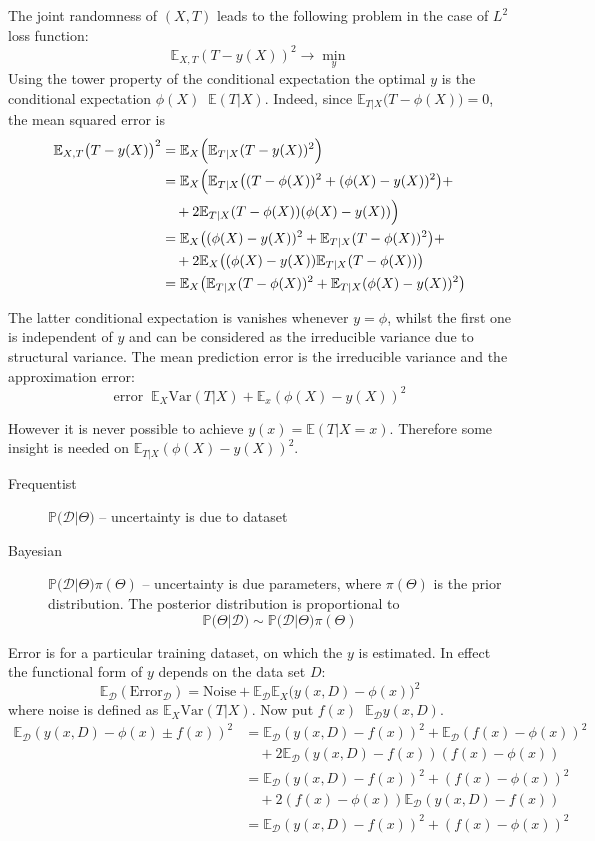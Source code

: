 \documentclass[a4paper]{article}
\newcommand{\brac}[1]{{\left ( #1 \right )}}
\newcommand{\Dcal}{\mathcal{D}}
\newcommand{\Ex}[0]{{\mathbb{E}}}
\newcommand{\pr}[0]{{\mathbb{P}}}
\newcommand{\Var}[0]{{\text{Var}}}
\newcommand{\defn}{\mathop{\overset{\Delta}{=}}\nolimits}
\begin{document}
The joint randomness of $(X,T)$ leads to the following problem in the case of $L^2$ loss function:
\[\Ex_{X,T} \brac{T-y(X)}^2 \to \min_y\]
Using the tower property of the conditional expectation the optimal $y$ is the conditional
expectation $\phi(X)\defn \Ex(T\rvert X)$. Indeed, since $\Ex_{T\rvert X} \bigl(T-\phi(X) \bigr) = 0$,
the mean squared error is \begin{align*}
	\Ex_{X,T} \bigl(T-y(X)\bigr)^2 &= \Ex_{X} \Bigl( \Ex_{T\rvert X} (T-y(X))^2 \Bigr) \\
		&= \Ex_X \Bigl( \Ex_{T\rvert X} \bigl( (T-\phi(X))^2+(\phi(X)-y(X))^2 \bigr) + \\
			&\quad + 2 \Ex_{T\rvert X} (T-\phi(X))(\phi(X)-y(X)) \Bigr) \\
		&= \Ex_X \bigl( (\phi(X)-y(X))^2 + \Ex_{T\rvert X} (T-\phi(X))^2 \bigr) + \\
			&\quad + 2 \Ex_X \bigl((\phi(X)-y(X)) \Ex_{T\rvert X} (T-\phi(X)) \bigr) \\
		&= \Ex_X \bigl( \Ex_{T\rvert X} (T-\phi(X))^2 + \Ex_{T\rvert X} (\phi(X)-y(X))^2 \bigr)
\end{align*}

The latter conditional expectation is vanishes whenever $y=\phi$, whilst the first one is
independent of $y$ and can be considered as the irreducible variance due to structural variance.
The mean prediction error is the irreducible variance and the approximation error:
\[\text{error} \defn \Ex_X \Var(T\rvert X) + \Ex_x (\phi(X)-y(X))^2 \]

However it is never possible to achieve $y(x) = \Ex(T\rvert X=x)$.
Therefore some insight is needed on $\Ex_{T\rvert X} (\phi(X)-y(X))^2$.
\begin{description}
	\item[Frequentist] $\pr\bigl(\Dcal\rvert \Theta\bigr)$ -- uncertainty is due to dataset
	\item[Bayesian] $\pr\bigl(\Dcal\rvert \Theta\bigr) \pi(\Theta)$ -- uncertainty is due
	parameters, where $\pi(\Theta)$ is the prior distribution.
	The posterior distribution is proportional to
		\[\pr\bigl(\Theta\rvert \Dcal\bigr) \sim \pr\bigl(\Dcal\rvert \Theta\bigr) \pi(\Theta)\]
\end{description}

Error is for a particular training dataset, on which the $y$ is estimated. In effect the
functional form of $y$ depends on the data set $D$:
\[\Ex_\Dcal(\text{Error}_\Dcal) = \text{Noise} + \Ex_\Dcal \Ex_X \bigl( y(x,D)-\phi(x) \bigr)^2\]
where noise is defined as $\Ex_X \Var(T\rvert X)$.
Now put $f(x) \defn \Ex_\Dcal y(x,D)$.
\begin{align*}
	\Ex_\Dcal( y(x,D)-\phi(x) \pm f(x) )^2
		& = \Ex_\Dcal( y(x,D) - f(x) )^2 + \Ex_\Dcal( f(x) - \phi(x) )^2 \\
			&\quad + 2 \Ex_\Dcal( y(x,D) - f(x) )( f(x) - \phi(x) ) \\
		& = \Ex_\Dcal( y(x,D) - f(x) )^2 + ( f(x) - \phi(x) )^2 \\
			&\quad + 2( f(x) - \phi(x) ) \Ex_\Dcal( y(x,D) - f(x) ) \\
		& = \Ex_\Dcal( y(x,D) - f(x) )^2 + ( f(x) - \phi(x) )^2 \\
\end{align*}
\end{document}
